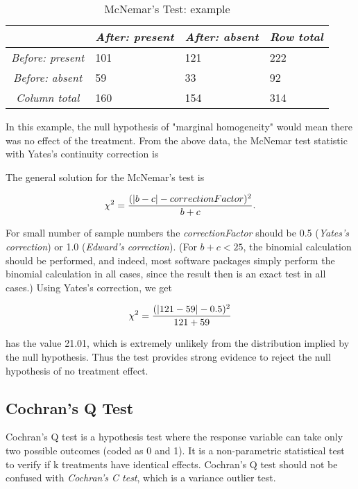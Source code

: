 \begin{table}
  \centering
  \begin{tabular}{|c|l l l|}
  \hline
  & \emph{After: present} & \emph{After: absent} & \emph{Row total} \\
  \hline
  \emph{Before: present} & 101 & 121 & 222 \\
  \emph{Before: absent} & 59 & 33 & 92 \\
  \emph{Column total} & 160 & 154 & 314 \\
  \hline
  \end{tabular}

  \caption{McNemar's Test: example}\label{table:McNemarExample}
\end{table}


In this example, the null hypothesis of "marginal homogeneity" would mean there was no effect of the treatment. From the above data, the McNemar test statistic with Yates's continuity correction is

The general solution for the McNemar's test is

\begin{equation}
    \chi^2 = {(|b-c|-correctionFactor)^2 \over b+c}.
\end{equation}

For small number of sample numbers the \emph{correctionFactor} should be 0.5 (\emph{Yates's correction}) or 1.0 (\emph{Edward's correction}). (For $b + c < 25$, the binomial calculation should be performed, and indeed, most software packages simply perform the binomial calculation in all cases, since the result then is an exact test in all cases.) Using Yates's correction, we get

\begin{equation}
    \chi^2 = {(|121 - 59| - 0.5)^2 \over {121 + 59}}
\end{equation}

has the value 21.01, which is extremely unlikely from the distribution implied by the null hypothesis. Thus the test provides strong evidence to reject the null hypothesis of no treatment effect.


\subsection{Cochran's Q Test}

Cochran's Q test is a hypothesis test where the response variable can take only two possible outcomes (coded as 0 and 1). It is a non-parametric statistical test to verify if k treatments have identical effects. Cochran's Q test should not be confused with \emph{Cochran's C test}, which is a variance outlier test.

